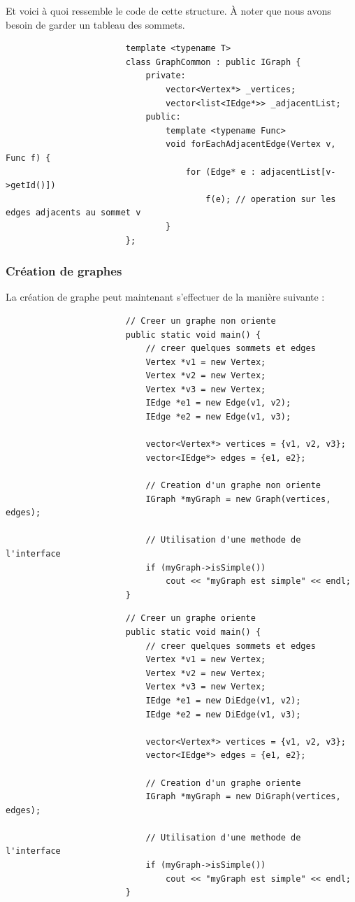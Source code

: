 \documentclass[french]{article}
\begin{document}
			Et voici à quoi ressemble le code de cette structure. À noter que nous avons besoin de garder un tableau des sommets.
			\begin{lstlisting}
						template <typename T>
						class GraphCommon : public IGraph {
							private:
								vector<Vertex*> _vertices;
								vector<list<IEdge*>> _adjacentList;
							public:
								template <typename Func>
								void forEachAdjacentEdge(Vertex v, Func f) {
									for (Edge* e : adjacentList[v->getId()]) 
										f(e); // operation sur les edges adjacents au sommet v
								}
						};
			\end{lstlisting}
			
			\subsubsection{Création de graphes}
			La création de graphe peut maintenant s'effectuer de la manière suivante :
			\begin{lstlisting}
						// Creer un graphe non oriente
						public static void main() {
							// creer quelques sommets et edges
							Vertex *v1 = new Vertex;
							Vertex *v2 = new Vertex;
							Vertex *v3 = new Vertex;
							IEdge *e1 = new Edge(v1, v2);
							IEdge *e2 = new Edge(v1, v3);
							
							vector<Vertex*> vertices = {v1, v2, v3};
							vector<IEdge*> edges = {e1, e2};
							
							// Creation d'un graphe non oriente
							IGraph *myGraph = new Graph(vertices, edges);
							
							// Utilisation d'une methode de l'interface
							if (myGraph->isSimple())
								cout << "myGraph est simple" << endl;
						}
			\end{lstlisting}
			\begin{lstlisting}
						// Creer un graphe oriente
						public static void main() {
							// creer quelques sommets et edges
							Vertex *v1 = new Vertex;
							Vertex *v2 = new Vertex;
							Vertex *v3 = new Vertex;
							IEdge *e1 = new DiEdge(v1, v2);
							IEdge *e2 = new DiEdge(v1, v3);
							
							vector<Vertex*> vertices = {v1, v2, v3};
							vector<IEdge*> edges = {e1, e2};
							
							// Creation d'un graphe oriente
							IGraph *myGraph = new DiGraph(vertices, edges);
							
							// Utilisation d'une methode de l'interface
							if (myGraph->isSimple())
								cout << "myGraph est simple" << endl;
						}
			\end{lstlisting}
\end{document}
